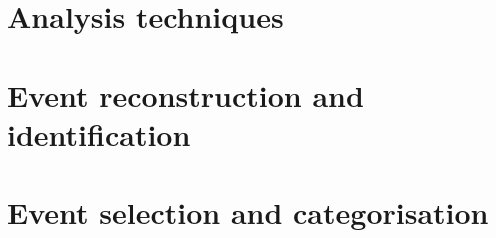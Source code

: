 
\begin{comment}

CERN ACC 2017 0007 --> beam energy uncertainty

\end{comment}


\chapter{Analysis techniques}


%

\chapter{Event reconstruction and identification}
\label{chap:4}

\chapter{Event selection and categorisation}


